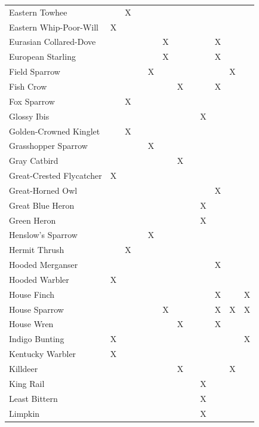 \documentclass[]{article}
\begin{document}
\begin{longtable}{llllllllllll}
\addlinespace
Eastern Towhee &  & X &  &  &  &  &  &  &  &  & \\
Eastern Whip-Poor-Will & X &  &  &  &  &  &  &  &  &  & \\
Eurasian Collared-Dove &  &  &  &  & X &  &  &  & X &  & \\
European Starling &  &  &  &  & X &  &  &  & X &  & \\
Field Sparrow &  &  &  & X &  &  &  &  &  & X & \\
\addlinespace
Fish Crow &  &  &  &  &  & X &  &  & X &  & \\
Fox Sparrow &  & X &  &  &  &  &  &  &  &  & \\
Glossy Ibis &  &  &  &  &  &  &  & X &  &  & \\
Golden-Crowned Kinglet &  & X &  &  &  &  &  &  &  &  & \\
Grasshopper Sparrow &  &  &  & X &  &  &  &  &  &  & \\
\addlinespace
Gray Catbird &  &  &  &  &  & X &  &  &  &  & \\
Great-Crested Flycatcher & X &  &  &  &  &  &  &  &  &  & \\
Great-Horned Owl &  &  &  &  &  &  &  &  & X &  & \\
Great Blue Heron &  &  &  &  &  &  &  & X &  &  & \\
Green Heron &  &  &  &  &  &  &  & X &  &  & \\
\addlinespace
Henslow's Sparrow &  &  &  & X &  &  &  &  &  &  & \\
Hermit Thrush &  & X &  &  &  &  &  &  &  &  & \\
Hooded Merganser &  &  &  &  &  &  &  &  & X &  & \\
Hooded Warbler & X &  &  &  &  &  &  &  &  &  & \\
House Finch &  &  &  &  &  &  &  &  & X &  & X\\
\addlinespace
House Sparrow &  &  &  &  & X &  &  &  & X & X & X\\
House Wren &  &  &  &  &  & X &  &  & X &  & \\
Indigo Bunting & X &  &  &  &  &  &  &  &  &  & X\\
Kentucky Warbler & X &  &  &  &  &  &  &  &  &  & \\
Killdeer &  &  &  &  &  & X &  &  &  & X & \\
\addlinespace
King Rail &  &  &  &  &  &  &  & X &  &  & \\
Least Bittern &  &  &  &  &  &  &  & X &  &  & \\
Limpkin &  &  &  &  &  &  &  & X &  &  & \\

\end{longtable}
\end{document}
